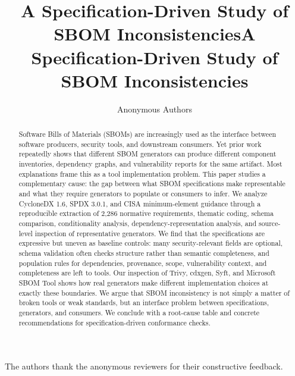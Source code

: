 \documentclass[sigconf, review, anonymous]{acmart}
\title{A Specification-Driven Study of SBOM Inconsistencies}
\author{Anonymous Authors}
\affiliation{%
  \institution{Anonymous Institution}
  \city{Anonymous City}
  \country{Anonymous Country}
}
\begin{document}
\title{A Specification-Driven Study of SBOM Inconsistencies}


\begin{abstract}
Software Bills of Materials (SBOMs) are increasingly used as the interface between software producers, security tools, and downstream consumers. Yet prior work repeatedly shows that different SBOM generators can produce different component inventories, dependency graphs, and vulnerability reports for the same artifact. Most explanations frame this as a tool implementation problem. This paper studies a complementary cause: the gap between what SBOM specifications make representable and what they require generators to populate or consumers to infer. We analyze CycloneDX 1.6, SPDX 3.0.1, and CISA minimum-element guidance through a reproducible extraction of 2,286 normative requirements, thematic coding, schema comparison, conditionality analysis, dependency-representation analysis, and source-level inspection of representative generators. We find that the specifications are expressive but uneven as baseline controls: many security-relevant fields are optional, schema validation often checks structure rather than semantic completeness, and population rules for dependencies, provenance, scope, vulnerability context, and completeness are left to tools. Our inspection of Trivy, cdxgen, Syft, and Microsoft SBOM Tool shows how real generators make different implementation choices at exactly these boundaries. We argue that SBOM inconsistency is not simply a matter of broken tools or weak standards, but an interface problem between specifications, generators, and consumers. We conclude with a root-cause table and concrete recommendations for specification-driven conformance checks.
\end{abstract}

\maketitle


\begin{acks}
The authors thank the anonymous reviewers for their constructive feedback.
\end{acks}
\end{document}
